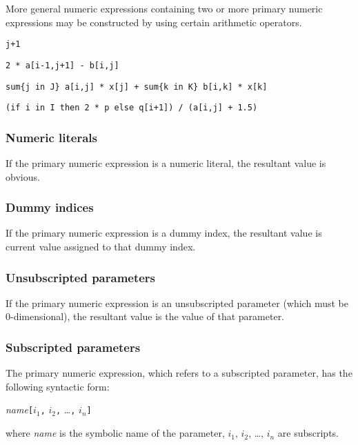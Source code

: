 \documentclass[10pt]{article}
\begin{document}
\medskip

More general numeric expressions containing two or more primary numeric
expressions may be constructed by using certain arithmetic operators.

\medskip


\medskip

\noindent\verb|j+1|

\noindent\verb|2 * a[i-1,j+1] - b[i,j]|

\noindent\verb|sum{j in J} a[i,j] * x[j] + sum{k in K} b[i,k] * x[k]|

\noindent\verb|(if i in I then 2 * p else q[i+1]) / (a[i,j] + 1.5)|

\subsubsection{Numeric literals}

If the primary numeric expression is a numeric literal, the resultant
value is obvious.

\subsubsection{Dummy indices}

If the primary numeric expression is a dummy index, the resultant value
is current value assigned to that dummy index.

\subsubsection{Unsubscripted parameters}

If the primary numeric expression is an unsubscripted parameter (which
must be 0-dimensional), the resultant value is the value of that
parameter.

\subsubsection{Subscripted parameters}

The primary numeric expression, which refers to a subscripted parameter,
has the following syntactic form:

\medskip

\noindent\hfil
{\it name}{\tt[}$i_1${\tt,} $i_2${\tt,} \dots{\tt,} $i_n${\tt]}

\medskip

\noindent where {\it name} is the symbolic name of the parameter,
$i_1$, $i_2$, \dots, $i_n$ are subscripts.
\end{document}
